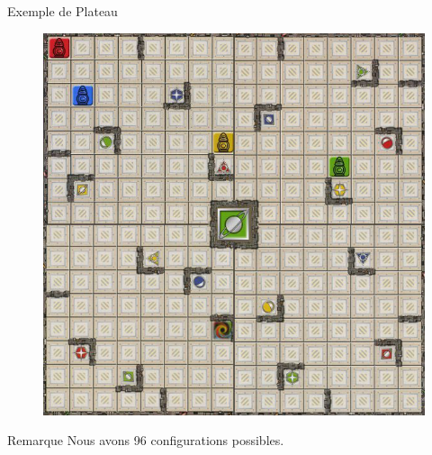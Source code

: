 \documentclass{beamer}
\begin{document}
    \begin{frame}{Exemple de Plateau}
        \begin{figure}
            \centering
            \includegraphics[scale=0.2]{Images/palteau3.jpg}
        \end{figure}
        \begin{block}{Remarque}
            Nous avons 96 configurations possibles.
        \end{block}
    \end{frame}
\end{document}

